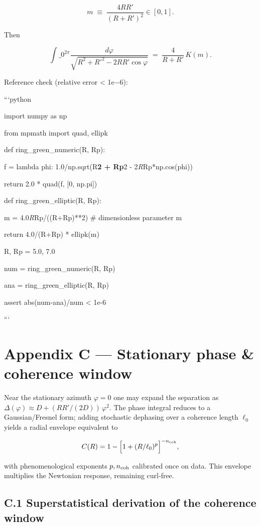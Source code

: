 \documentclass[11pt,a4paper]{article}
\begin{document}
\[

 m \;\equiv\; \frac{4 R R'}{(R+R')^2} \in [0,1].

\]

Then

\[

\int\_{0}^{2\pi} \frac{d\varphi}{\sqrt{R^2 + R'^2 - 2 R R'\cos\varphi}} \;=\; \frac{4}{R+R'}\,K(m).

\]


Reference check (relative error < 1e−6):


```python

import numpy as np

from mpmath import quad, ellipk


def ring\_green\_numeric(R, Rp):

    f = lambda phi: 1.0/np.sqrt(R\textbf{2 + Rp}2 - 2\textit{R}Rp*np.cos(phi))

    return 2.0 * quad(f, [0, np.pi])


def ring\_green\_elliptic(R, Rp):

    m = 4.0\textit{R}Rp/((R+Rp)**2)  \# dimensionless parameter m \in [0,1]

    return 4.0/(R+Rp) * ellipk(m)


R, Rp = 5.0, 7.0

num = ring\_green\_numeric(R, Rp)

ana = ring\_green\_elliptic(R, Rp)

assert abs(num-ana)/num < 1e-6

```


\section{Appendix C — Stationary phase \& coherence window}


Near the stationary azimuth $\varphi=0$ one may expand the separation as $\Delta(\varphi)\approx D + (RR'/(2D))\,\varphi^2$. The phase integral reduces to a Gaussian/Fresnel form; adding stochastic dephasing over a coherence length $\ell_0$ yields a radial envelope equivalent to


\begin{equation}
C(R) = 1 - \Big[1 + (R/\ell_0)^p\Big]^{-n_{\rm coh}} ,
\end{equation}


with phenomenological exponents $p,n_{\rm coh}$ calibrated once on data. This envelope multiplies the Newtonian response, remaining curl‑free.


\subsection{C.1 Superstatistical derivation of the coherence window}
\end{document}
